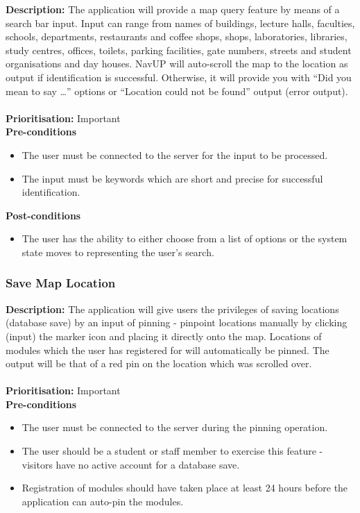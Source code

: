 \documentclass[runningheads,a4paper]{article}
\begin{document}
\textbf{Description:}  The application will provide a map query feature by means of a search bar input. Input can range from names of buildings, lecture halls, faculties, schools, departments, restaurants and coffee shops, shops, laboratories, libraries, study centres, offices, toilets,  parking facilities, gate numbers, streets and student organisations and day houses. NavUP will auto-scroll the map to the location as output if identification is successful. Otherwise, it will provide you with “Did you mean to say …” options or “Location could not be found” output (error output).\\\\
\noindent
\textbf{Prioritisation:} Important\\
  
  
\textbf{Pre-conditions}
\begin{itemize}
 	\item The user must be connected to the server for the input to be processed.
	\item The input must be keywords which are short and precise for successful identification.
\end{itemize}
  
\textbf{Post-conditions}
\begin{itemize}
  	\item The user has the ability to either choose from a list of options or the system state moves to representing the user's search.
\end{itemize}

\subsubsection{Save Map Location}

\textbf{Description:}  The application will give users the privileges of saving locations (database save) by an input of pinning - pinpoint locations manually by clicking (input) the marker icon and placing it directly onto the map. Locations of modules which the user has registered for will automatically be pinned. The output will be that of a red pin on the location which was scrolled over.\\\\
\noindent
\textbf{Prioritisation:} Important\\
  
  
\textbf{Pre-conditions}
\begin{itemize}
 	\item The user must be connected to the server during the pinning operation.
	\item The user should be a student or staff member to exercise this feature - visitors have no active account for a database save.
	\item Registration of modules should have taken place at least 24 hours before the application can auto-pin the modules.
\end{itemize}
  
\end{document}
